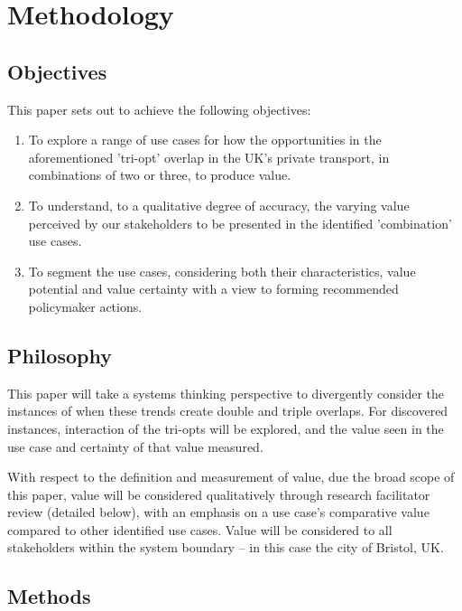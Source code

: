\documentclass[journal]{IEEEtran}
\begin{document}
\section{Methodology}\label{methodology}

\subsection{Objectives}

This paper sets out to achieve the following objectives:

\begin{enumerate}
\item To explore a range of use cases for how the opportunities in the
  aforementioned 'tri-opt' overlap in the UK's private transport, in
  combinations of two or three, to produce value.  
\item To understand, to a qualitative degree of accuracy,
  the varying value perceived by our stakeholders to be presented in
  the identified 'combination' use cases. 
\item To segment the use cases, considering both their
  characteristics, value potential and value certainty with a view to forming
  recommended policymaker actions.
\end{enumerate}

\subsection{Philosophy}

This paper will take a systems thinking perspective to divergently
consider the instances of when these trends create double and triple
overlaps. For discovered instances, interaction of the tri-opts will be explored, and the value seen in the use case and certainty of that value measured.

With respect to the definition and measurement of value, due
the broad scope of this paper, value will be considered qualitatively through research facilitator review (detailed below),
with an emphasis on a use case's comparative value compared to other
identified use cases. Value will be considered to all stakeholders
within the system boundary -- in this case the city of Bristol, UK.

\subsection{Methods}
\end{document}

